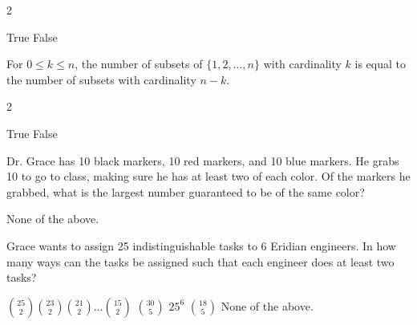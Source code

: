 \documentclass[11pt,addpoints]{exam}
\begin{document}
\begin{questions}
\begin{multicols}{2}
    \begin{choices}
        \choice True %
        \choice False  
    \end{choices}
\end{multicols}


\question[3] For $0\leq k\leq n$, the number of subsets of $\{1,2,\ldots, n\}$ with cardinality $k$ is equal to the number of subsets with cardinality $n-k$.

\begin{multicols}{2}
    \begin{choices}
        \choice True %
        \choice False 
    \end{choices}
\end{multicols}


\newpage

\question[5] Dr. Grace has 10 black markers, 10 red markers, and 10 blue markers. He grabs 10 to go to class, making sure he has at least two of each color. Of the markers he grabbed, what is the largest number guaranteed to be of the same color?


    \begin{choices}
    \choice None of the above.
\end{choices}





\question[5] Grace wants to assign 25 indistinguishable tasks to 6 Eridian engineers.  In how many ways can the tasks be assigned such that each engineer does at least two tasks?


    \begin{choices}
    \choice ${25\choose 2}{23\choose 2}{21\choose 2}\ldots{15\choose 2}$
    \choice ${30\choose 5}$
    \choice $25^6$
    \choice ${18\choose 5}$%
    \choice None of the above.
\end{choices}





\end{questions}
\end{document}

